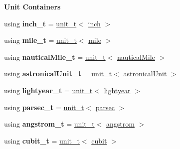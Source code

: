 \begin{Indent}{\bf Unit Containers}
\begin{DoxyCompactItemize}
\item 
\hypertarget{namespaceunits_1_1length_ad5800e0933b0a2bc826cea7aae40728c}{}using {\bfseries inch\+\_\+t} = \hyperlink{classunits_1_1unit__t}{unit\+\_\+t}$<$ \hyperlink{structunits_1_1unit}{inch} $>$\label{namespaceunits_1_1length_ad5800e0933b0a2bc826cea7aae40728c}

\item 
\hypertarget{namespaceunits_1_1length_a2648f459ba5f300486495b7f8c2cb841}{}using {\bfseries mile\+\_\+t} = \hyperlink{classunits_1_1unit__t}{unit\+\_\+t}$<$ \hyperlink{structunits_1_1unit}{mile} $>$\label{namespaceunits_1_1length_a2648f459ba5f300486495b7f8c2cb841}

\item 
\hypertarget{namespaceunits_1_1length_aeef81491413c1505b134e89c40f02c17}{}using {\bfseries nautical\+Mile\+\_\+t} = \hyperlink{classunits_1_1unit__t}{unit\+\_\+t}$<$ \hyperlink{structunits_1_1unit}{nautical\+Mile} $>$\label{namespaceunits_1_1length_aeef81491413c1505b134e89c40f02c17}

\item 
\hypertarget{namespaceunits_1_1length_ab3c140946fa233af50fbd86999b0cb9d}{}using {\bfseries astronical\+Unit\+\_\+t} = \hyperlink{classunits_1_1unit__t}{unit\+\_\+t}$<$ \hyperlink{structunits_1_1unit}{astronical\+Unit} $>$\label{namespaceunits_1_1length_ab3c140946fa233af50fbd86999b0cb9d}

\item 
\hypertarget{namespaceunits_1_1length_add98116c25e56cffde572eaec9efa7d4}{}using {\bfseries lightyear\+\_\+t} = \hyperlink{classunits_1_1unit__t}{unit\+\_\+t}$<$ \hyperlink{structunits_1_1unit}{lightyear} $>$\label{namespaceunits_1_1length_add98116c25e56cffde572eaec9efa7d4}

\item 
\hypertarget{namespaceunits_1_1length_a9e94e80ab9beda1a237794a7fd809ae4}{}using {\bfseries parsec\+\_\+t} = \hyperlink{classunits_1_1unit__t}{unit\+\_\+t}$<$ \hyperlink{structunits_1_1unit}{parsec} $>$\label{namespaceunits_1_1length_a9e94e80ab9beda1a237794a7fd809ae4}

\item 
\hypertarget{namespaceunits_1_1length_a0a60ce90d269d151d60ee0d0f2e01736}{}using {\bfseries angstrom\+\_\+t} = \hyperlink{classunits_1_1unit__t}{unit\+\_\+t}$<$ \hyperlink{structunits_1_1unit}{angstrom} $>$\label{namespaceunits_1_1length_a0a60ce90d269d151d60ee0d0f2e01736}

\item 
\hypertarget{namespaceunits_1_1length_a11ccaa361f6c92e9ba9a20090cc12a71}{}using {\bfseries cubit\+\_\+t} = \hyperlink{classunits_1_1unit__t}{unit\+\_\+t}$<$ \hyperlink{structunits_1_1unit}{cubit} $>$\label{namespaceunits_1_1length_a11ccaa361f6c92e9ba9a20090cc12a71}


\end{DoxyCompactItemize}
\end{Indent}

